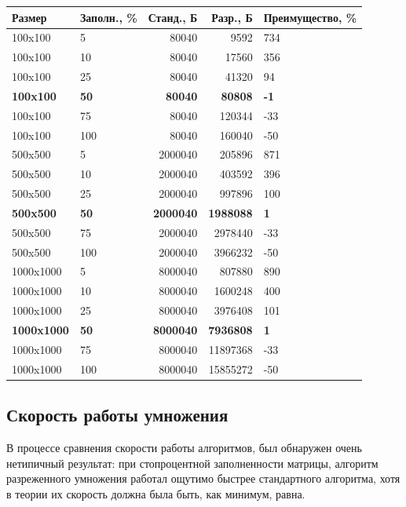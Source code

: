 \documentclass[a4paper,12pt]{extarticle}
\begin{document}
\begin{tabular}{ |l|l|r|r|l| }
\hline
\textbf{Размер} & \textbf{Заполн., \%} & \textbf{Станд., Б} & \textbf{Разр., Б} & \textbf{Преимущество, \%} \\ \hline

100x100 & 5 & 80040 & 9592 & 734 \\ \hline
100x100 & 10 & 80040 & 17560 & 356 \\ \hline
100x100 & 25 & 80040 & 41320 & 94 \\ \hline
\textbf{100x100} & \textbf{50} & \textbf{80040} & \textbf{80808} & \textbf{-1} \\ \hline
100x100 & 75 & 80040 & 120344 & -33 \\ \hline
100x100 & 100 & 80040 & 160040 & -50 \\ \hline
500x500 & 5 & 2000040 & 205896 & 871 \\ \hline
500x500 & 10 & 2000040 & 403592 & 396 \\ \hline
500x500 & 25 & 2000040 & 997896 & 100 \\ \hline
\textbf{500x500} & \textbf{50} & \textbf{2000040} & \textbf{1988088} & \textbf{1} \\ \hline
500x500 & 75 & 2000040 & 2978440 & -33 \\ \hline
500x500 & 100 & 2000040 & 3966232 & -50 \\ \hline
1000x1000 & 5 & 8000040 & 807880 & 890 \\ \hline
1000x1000 & 10 & 8000040 & 1600248 & 400 \\ \hline
1000x1000 & 25 & 8000040 & 3976408 & 101 \\ \hline
\textbf{1000x1000} & \textbf{50} & \textbf{8000040} & \textbf{7936808} & \textbf{1} \\ \hline
1000x1000 & 75 & 8000040 & 11897368 & -33 \\ \hline
1000x1000 & 100 & 8000040 & 15855272 & -50 \\ \hline

\end{tabular}

\subsection{Скорость работы умножения}

В процессе сравнения скорости работы алгоритмов, был обнаружен очень нетипичный результат: при стопроцентной заполненности матрицы, алгоритм разреженного умножения работал ощутимо быстрее стандартного алгоритма, хотя в теории их скорость должна была быть, как минимум, равна.
\end{document}
